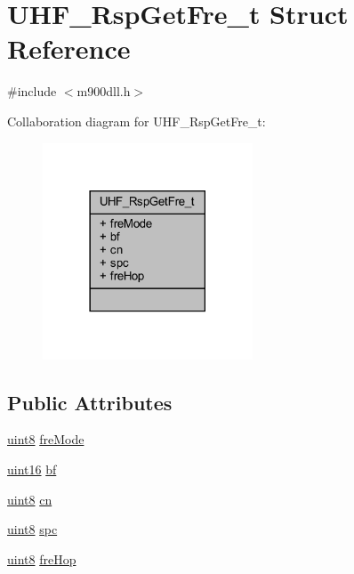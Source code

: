 \hypertarget{struct_u_h_f___rsp_get_fre__t}{}\section{U\+H\+F\+\_\+\+Rsp\+Get\+Fre\+\_\+t Struct Reference}
\label{struct_u_h_f___rsp_get_fre__t}


{\ttfamily \#include $<$m900dll.\+h$>$}



Collaboration diagram for U\+H\+F\+\_\+\+Rsp\+Get\+Fre\+\_\+t\+:
\nopagebreak
\begin{figure}[H]
\begin{center}
\leavevmode
\includegraphics[width=177pt]{struct_u_h_f___rsp_get_fre__t__coll__graph}
\end{center}
\end{figure}
\subsection*{Public Attributes}
\begin{DoxyCompactItemize}
\item 
\mbox{\hyperlink{m900dll_8h_adde6aaee8457bee49c2a92621fe22b79}{uint8}} \mbox{\hyperlink{struct_u_h_f___rsp_get_fre__t_ad1b6bdceca1dd4b75a5bafc0edc90889}{fre\+Mode}}
\item 
\mbox{\hyperlink{m900dll_8h_a05f6b0ae8f6a6e135b0e290c25fe0e4e}{uint16}} \mbox{\hyperlink{struct_u_h_f___rsp_get_fre__t_ad1a35e89b9034cdbc97dbbd372fe2eea}{bf}}
\item 
\mbox{\hyperlink{m900dll_8h_adde6aaee8457bee49c2a92621fe22b79}{uint8}} \mbox{\hyperlink{struct_u_h_f___rsp_get_fre__t_a01465d835c226efbd4a38570ead81f3b}{cn}}
\item 
\mbox{\hyperlink{m900dll_8h_adde6aaee8457bee49c2a92621fe22b79}{uint8}} \mbox{\hyperlink{struct_u_h_f___rsp_get_fre__t_a8b2aa758e0dfc2ef9abef3f95e005eac}{spc}}
\item 
\mbox{\hyperlink{m900dll_8h_adde6aaee8457bee49c2a92621fe22b79}{uint8}} \mbox{\hyperlink{struct_u_h_f___rsp_get_fre__t_a3c30e17801134c4064fc3347afaab21a}{fre\+Hop}}
\end{DoxyCompactItemize}



